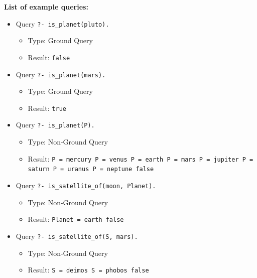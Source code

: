 \documentclass[12pt]{article}
\begin{document}
\begin{enumerate}
		\textbf{List of example queries:}
		\begin{itemize}
			\item Query \texttt{?- is\_planet(pluto).}
			\begin{itemize}
				\item Type: Ground Query
				\item Result: \texttt{false}
			\end{itemize}
			\item Query \texttt{?- is\_planet(mars).}
			\begin{itemize}
				\item Type: Ground Query
				\item Result: \texttt{true}
			\end{itemize}
			\item Query \texttt{?- is\_planet(P).}
			\begin{itemize}
				\item Type: Non-Ground Query
				\item Result: \texttt{\newline P = mercury \newline P = venus  \newline P = earth \newline P = mars \newline P = jupiter \newline P = saturn \newline P = uranus \newline P = neptune \newline false}
			\end{itemize}
			\item Query \texttt{?- is\_satellite\_of(moon, Planet).}
			\begin{itemize}
				\item Type: Non-Ground Query
				\item Result: \texttt{\newline Planet = earth \newline false}
			\end{itemize}
			\item Query \texttt{?- is\_satellite\_of(S, mars).}
			\begin{itemize}
				\item Type: Non-Ground Query
				\item Result: \texttt{\newline S = deimos \newline S = phobos \newline false}
			\end{itemize}
		\end{itemize}
		

\end{enumerate}
\end{document}

